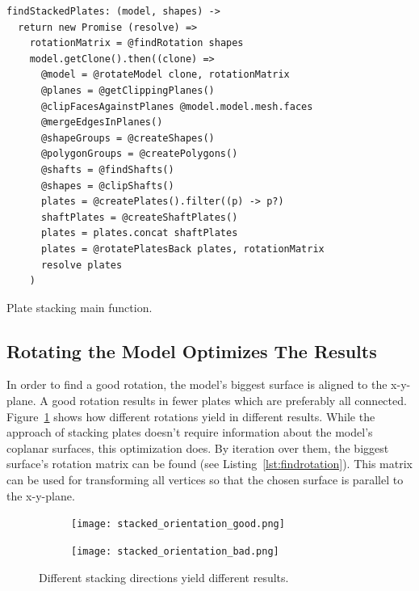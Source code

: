 \documentclass[../ClassicThesis.tex]{subfiles}
\begin{document}
\begin{listing}
\begin{verbatim}
findStackedPlates: (model, shapes) ->
  return new Promise (resolve) =>
    rotationMatrix = @findRotation shapes
    model.getClone().then((clone) =>
      @model = @rotateModel clone, rotationMatrix
      @planes = @getClippingPlanes()
      @clipFacesAgainstPlanes @model.model.mesh.faces
      @mergeEdgesInPlanes()
      @shapeGroups = @createShapes()
      @polygonGroups = @createPolygons()
      @shafts = @findShafts()
      @shapes = @clipShafts()
      plates = @createPlates().filter((p) -> p?)
      shaftPlates = @createShaftPlates()
      plates = plates.concat shaftPlates
      plates = @rotatePlatesBack plates, rotationMatrix
      resolve plates
    )
\end{verbatim}
\caption{Plate stacking main function.}
\label{lst:stackedmain}
\end{listing}

\subsection{Rotating the Model Optimizes The Results}

In order to find a good rotation, the model's biggest surface is aligned to the x-y-plane. A good rotation results in fewer plates which are preferably all connected. Figure~\ref{fig:stackingorientations} shows how different rotations yield in different results. While the approach of stacking plates doesn't require information about the model's coplanar surfaces, this optimization does. By iteration over them, the biggest surface's rotation matrix can be found (see Listing~\ref{lst:findrotation}). This matrix can be used for transforming all vertices so that the chosen surface is parallel to the x-y-plane.

\begin{figure}
  \centering
  \begin{subfigure}[t]{0.4\textwidth}
    \centering
    \texttt{[image: stacked\_orientation\_good.png]}
  \end{subfigure}
  \begin{subfigure}[t]{0.4\textwidth}
    \centering
    \texttt{[image: stacked\_orientation\_bad.png]}
  \end{subfigure}
  \caption{Different stacking directions yield different results.}
  \label{fig:stackingorientations}
\end{figure}
\end{document}

